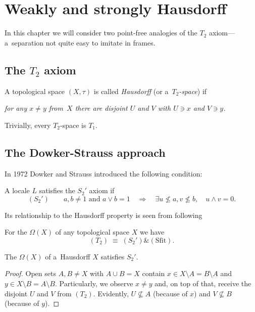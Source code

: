 \chapter{Weakly and strongly Hausdorff}

In this chapter we will consider two point-free analogies of the $T_2$
axiom---a~separation not quite easy to imitate in frames.

\section{The $T_2$ axiom}

\begin{framed}
  \begin{df}[$T_2$]
    A topological space $(X, \tau)$ is called \emph{Hausdorff\/} (or
    a~\emph{$T_2$-space\/}) if
    \begin{center} \it
      for any $x \ne y$ from~$X$ there are disjoint $U$ and $V$ with $U\owns x$
      and $V\owns y$.
    \end{center}
  \end{df}
\end{framed}

\begin{rem} \label{T2->T1}
  Trivially, every $T_2$-space is $T_1$.
\end{rem}

\section{The Dowker-Strauss approach}

In 1972 Dowker and Strauss \cite{ds72} introduced the following condition:

\begin{framed}
  \begin{df}
    A locale $L$ satisfies the $S_2'$ axiom if
    \[
      (S_2') \qquad
      a, b \ne 1 \text{ and } a \vee b = 1 \quad \Rightarrow \quad \exists
      u\not\leq a, v\not\leq b, \quad u \wedge v = 0.
    \]
  \end{df}
\end{framed}

Its relationship to the Hausdorff property is seen from following
\begin{thm} \label{thm:T2=S2'+Sfit}
  For the $\Omega(X)$ of any topological space $X$ we have
  \[
    (T_2) \; \equiv \; (S_2') \& (\text{Sfit}).
  \]
\end{thm}

\begin{lem} \label{Haus->S2'}
  The $\Omega(X)$ of a~Hausdorff $X$ satisfies $S_2'$.
\end{lem}
\begin{proof}
  Open sets $A, B \ne X$ with $A \cup B = X$ contain $x\in X\setminus A =
  B\setminus A$ and $y\in X\setminus B = A\setminus B$.
  Particularly, we observe $x \ne y$ and, on top of that, receive the disjoint
  $U$ and $V$ from $(T_2)$.
  Evidently, $U\not\subseteq A$ (because of $x$) and $V\not\subseteq B$
  (because of $y$).
\end{proof}

